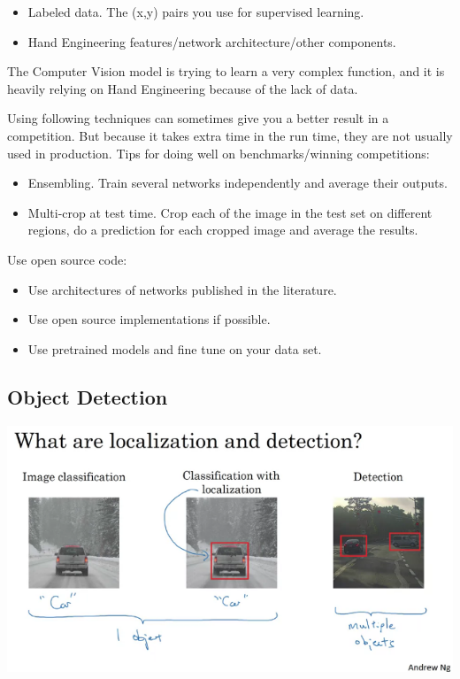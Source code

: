 \documentclass{article}
\begin{document}
\begin{itemize}
    \item Labeled data. The (x,y) pairs you use for supervised learning. 
    \item Hand Engineering features/network architecture/other components.
\end{itemize}

\noindent The Computer Vision model is trying to learn a very complex function, and it is heavily relying on Hand Engineering because of the lack of data.

\bigskip

\noindent Using following techniques can sometimes give you a better result in a competition. But because it takes extra time in the run time, they are not usually used in production. Tips for doing well on benchmarks/winning competitions:

\begin{itemize}
    \item Ensembling. Train several networks independently and average their outputs. 
    \item Multi-crop at test time. Crop each of the image in the test set on different regions, do a prediction for each cropped image and average the results.
\end{itemize}

\noindent Use open source code:

\begin{itemize}
    \item Use architectures of networks published in the literature.
    \item Use open source implementations if possible.
    \item Use pretrained models and fine tune on your data set.
\end{itemize}

\subsection{Object Detection}

\begin{center}
\includegraphics[scale=0.5]{./images/object_localization_and_detection.png}
\end{center}
\end{document}
